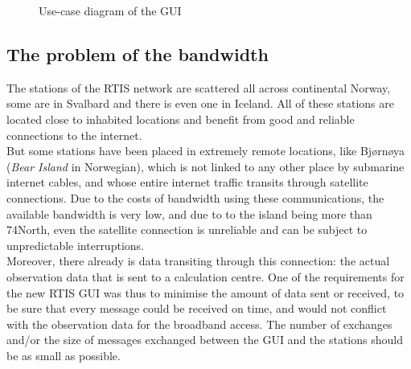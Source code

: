 \documentclass{themeensg}
\begin{document}
\begin{figure}[ht]
	\begin{center}
	\end{center}
	\caption{Use-case diagram of the GUI}
\end{figure}

\subsection{The problem of the bandwidth}

The stations of the RTIS network are scattered all across continental Norway, some are in Svalbard and there is even one in Iceland. All of these stations are located close to inhabited locations and benefit from good and reliable connections to the internet.\\

But some stations have been placed in extremely remote locations, like Bjørnøya (\textit{Bear Island} in Norwegian), which is not linked to any other place by submarine internet cables, and whose entire internet traffic transits through satellite connections. Due to the costs of bandwidth using these communications, the available bandwidth is very low, and due to to the island being more than 74\degre North, even the satellite connection is unreliable and can be subject to unpredictable interruptions. \\

Moreover, there already is data transiting through this connection: the actual observation data that is sent to a calculation centre. One of the requirements for the new RTIS GUI was thus to minimise the amount of data sent or received, to be sure that every message could be received on time, and would not conflict with the observation data for the broadband access. The number of exchanges and/or the size of messages exchanged between the GUI and the stations should be as small as possible.\\
\end{document}
